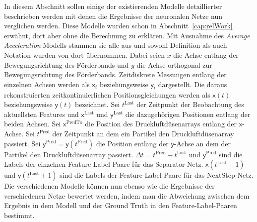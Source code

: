 
In diesem Abschnitt sollen einige der existierenden Modelle detaillierter beschrieben werden mit denen die Ergebnisse der neuronalen Netze nun verglichen werden.
Diese Modelle wurden schon in Abschnitt~\ref{cap:relWork} erwähnt, dort aber ohne die Berechnung zu erklären.
Mit Ausnahme des \textit{Average Acceleration} Modells stammen sie alle aus \cite{Pfaff2018} und sowohl Definition als auch Notation wurden von dort übernommen.
Dabei seien \(x\) die Achse entlang der Bewegungsrichtung des Förderbands und \(y\) die Achse orthogonal zur Bewegungsrichtung des Förderbands.
Zeitdiskrete Messungen entlang der einzelnen Achsen werden als \(\mathsf{x}_t\) beziehungsweise \(\mathsf{y}_t\) dargestellt.
Die daraus rekonstruierten zeitkontinuierlichen Positionsgleichungen werden als \(\mathsf{x}(t)\) beziehungsweise \(\mathsf{y}(t)\) bezeichnet.
Sei \(t^{\text{Last}}\) der Zeitpunkt der Beobachtung des aktuellsten Features und \(\mathsf{x}^{\text{Last}}\) und \(\mathsf{y}^{\text{Last}}\) die dazugehörigen Positionen entlang der beiden Achsen.
Sei \(\mathsf{x}^{\text{PredTo}}\) die Position des Druckluftdüsenarrays entlang der \(\mathsf{x}\)-Achse.
Sei \(t^{\text{Pred}}\) der Zeitpunkt an dem ein Partikel den Druckluftdüsenarray passiert.
Sei \(\mathsf{y}^{\text{Pred}} = \mathsf{y}(t^{\text{Pred}})\) die Position entlang der \(\mathsf{y}\)-Achse an dem der Partikel den Druckluftdüsenarray passiert.
\(\Delta t = t^{\text{Pred}} - t^{\text{Last}} \) und \(\mathsf{y}^{\text{Pred}}\) sind die Labels der einzelnen Feature-Label-Paare für das Separator-Netz.
\(\mathsf{x}(t^{\text{Last}} + 1)\) und \(\mathsf{y}(t^{\text{Last}} + 1)\) sind die Labels der Feature-Label-Paare für das NextStep-Netz.
Die verschiedenen Modelle können nun ebenso wie die Ergebnisse der verschiedenen Netze bewertet werden, 
indem man die Abweichung zwischen dem Ergebnis in dem Modell und der Ground Truth in den Feature-Label-Paaren bestimmt.


